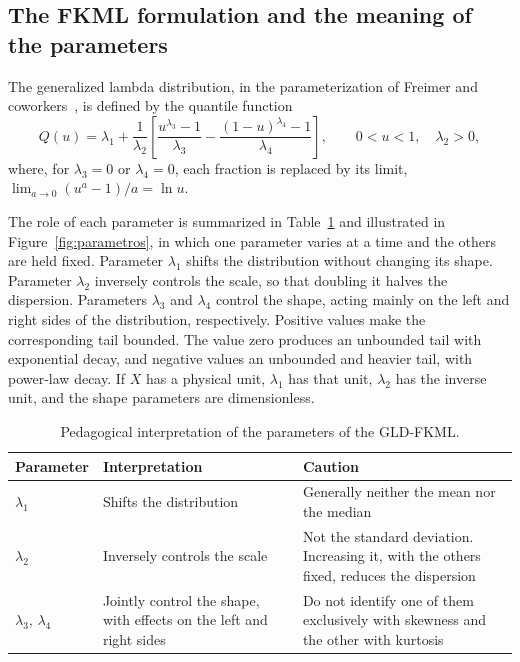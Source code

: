 

\subsection{The FKML formulation and the meaning of the parameters}

The generalized lambda distribution, in the parameterization of Freimer and coworkers~\cite{freimer1988}, is defined by the quantile function
\begin{equation}
    Q(u) = \lambda_1 + \frac{1}{\lambda_2}
    \left[\frac{u^{\lambda_3} - 1}{\lambda_3} - \frac{(1-u)^{\lambda_4} - 1}{\lambda_4}\right],
    \qquad 0 < u < 1, \quad \lambda_2 > 0,
    \label{eq:fkml}
\end{equation}
where, for $\lambda_3 = 0$ or $\lambda_4 = 0$, each fraction is replaced by its limit, $\lim_{a \to 0} (u^a - 1)/a = \ln u$.

The role of each parameter is summarized in Table~\ref{tab:parametros} and illustrated in Figure~\ref{fig:parametros}, in which one parameter varies at a time and the others are held fixed. Parameter $\lambda_1$ shifts the distribution without changing its shape. Parameter $\lambda_2$ inversely controls the scale, so that doubling it halves the dispersion. Parameters $\lambda_3$ and $\lambda_4$ control the shape, acting mainly on the left and right sides of the distribution, respectively. Positive values make the corresponding tail bounded. The value zero produces an unbounded tail with exponential decay, and negative values an unbounded and heavier tail, with power-law decay. If $X$ has a physical unit, $\lambda_1$ has that unit, $\lambda_2$ has the inverse unit, and the shape parameters are dimensionless.

\begin{table}[htbp]
\centering
\caption{Pedagogical interpretation of the parameters of the GLD-FKML.}
\label{tab:parametros}
\small
\begin{tabular}{p{2.1cm} p{5.4cm} p{6.5cm}}
\toprule
\textbf{Parameter} & \textbf{Interpretation} & \textbf{Caution} \\
\midrule
$\lambda_1$ & Shifts the distribution & Generally neither the mean nor the median \\
$\lambda_2$ & Inversely controls the scale & Not the standard deviation. Increasing it, with the others fixed, reduces the dispersion \\
$\lambda_3$, $\lambda_4$ & Jointly control the shape, with effects on the left and right sides & Do not identify one of them exclusively with skewness and the other with kurtosis \\
\bottomrule
\end{tabular}
\end{table}

